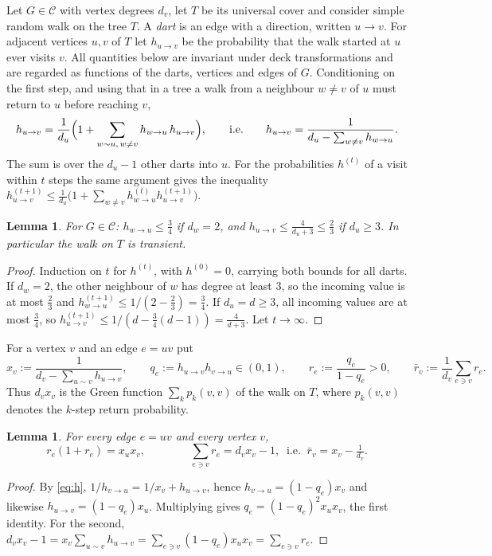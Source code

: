 \documentclass[11pt]{amsart}
\theoremstyle{plain}
\newtheorem{lemma}[theorem]{Lemma}
\theoremstyle{remark}
\newcommand{\cC}{\mathcal{C}}
\newcommand{\rb}{\bar r}
\begin{document}
Let $G\in\cC$ with vertex degrees $d_v$, let $T$ be its universal cover and consider simple random walk on the
tree $T$. A \emph{dart} is an edge with a direction, written $u\to v$. For adjacent vertices $u,v$ of $T$ let
$h_{u\to v}$ be the probability that the walk started at $u$ ever visits $v$. All quantities below are invariant under deck transformations and are regarded as functions of
the darts, vertices and edges of $G$. Conditioning on the first step, and using that in a tree a walk from a
neighbour $w\ne v$ of $u$ must return to $u$ before reaching $v$,
\begin{equation}\label{eq:h}
 h_{u\to v}=\frac1{d_u}\Bigl(1+\sum_{w\sim u,\,w\ne v}h_{w\to u}\,h_{u\to v}\Bigr),\qquad\text{i.e.}\qquad
 h_{u\to v}=\frac1{d_u-\sum_{w\ne v}h_{w\to u}} .
\end{equation}
The sum is over the $d_u-1$ other darts into $u$. For the probabilities $h^{(t)}$ of a visit within $t$ steps the
same argument gives the inequality
$h^{(t+1)}_{u\to v}\le\frac1{d_u}\bigl(1+\sum_{w\ne v}h^{(t)}_{w\to u}h^{(t+1)}_{u\to v}\bigr)$.

\begin{lemma}\label{lem:apriori}
For $G\in\cC$: $h_{w\to u}\le\frac34$ if $d_w=2$, and $h_{u\to v}\le\frac4{d_u+3}\le\frac23$ if $d_u\ge3$. In
particular the walk on $T$ is transient.
\end{lemma}
\begin{proof}
Induction on $t$ for $h^{(t)}$, with $h^{(0)}=0$, carrying both bounds for all darts. If $d_w=2$, the other
neighbour of $w$ has degree at least $3$, so the incoming value is at most $\frac23$ and
$h^{(t+1)}_{w\to u}\le1/(2-\frac23)=\frac34$. If $d_u=d\ge3$, all incoming values are at most $\frac34$, so
$h^{(t+1)}_{u\to v}\le1/(d-\frac34(d-1))=\frac4{d+3}$. Let $t\to\infty$.
\end{proof}

For a vertex $v$ and an edge $e=uv$ put
\[
 x_v:=\frac1{d_v-\sum_{u\sim v}h_{u\to v}},\qquad q_e:=h_{u\to v}h_{v\to u}\in(0,1),\qquad
 r_e:=\frac{q_e}{1-q_e}>0,\qquad \rb_v:=\frac1{d_v}\sum_{e\ni v}r_e .
\]
Thus $d_vx_v$ is the Green function $\sum_kp_k(v,v)$ of the walk on $T$, where $p_k(v,v)$ denotes the $k$-step
return probability.

\begin{lemma}\label{lem:ident}
For every edge $e=uv$ and every vertex $v$,
\begin{equation}\label{eq:I}
 r_e(1+r_e)=x_ux_v,\qquad\qquad \sum_{e\ni v}r_e=d_vx_v-1,\ \text{ i.e. }\ \rb_v=x_v-\tfrac1{d_v}.
\end{equation}
\end{lemma}
\begin{proof}
By \eqref{eq:h}, $1/h_{v\to u}=1/x_v+h_{u\to v}$, hence $h_{v\to u}=(1-q_e)x_v$ and likewise
$h_{u\to v}=(1-q_e)x_u$. Multiplying gives $q_e=(1-q_e)^2x_ux_v$, the first identity. For the second,
$d_vx_v-1=x_v\sum_{u\sim v}h_{u\to v}=\sum_{e\ni v}(1-q_e)x_ux_v=\sum_{e\ni v}r_e$.
\end{proof}
\end{document}
